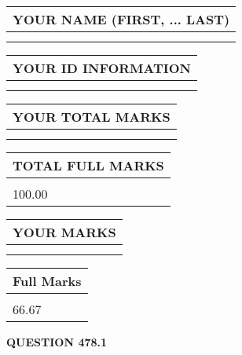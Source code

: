\documentclass{ctexart}
\begin{document}
   
   
   
\newpage 
\setcounter{page}{ 
   478001 } 
   
   
   
   
\noindent\begin{tabular}{|l|}
\hline
YOUR NAME (FIRST, ... LAST)  \\
\hline
 \\ 
 \\ 
\hline
\end{tabular}
\hspace{0.05in} \begin{tabular}{|l|}
\hline
 YOUR   ID   INFORMATION  \\
\hline
 \\ 
 \\ 
\hline
\end{tabular}
   
   
\vspace{0.2in}\noindent\begin{tabular}{|l|}
\hline
YOUR TOTAL MARKS  \\
\hline
 \\ 
 \\ 
\hline
\end{tabular}
\hspace{0.05in} \begin{tabular}{|l|}
\hline
TOTAL FULL MARKS  \\
\hline
 \\ 
100.00 \\
\hline
\end{tabular}
   
   
 \vspace{0.2in}
 
 
 
 
   
   
  
\vspace{0.2in}
  
\noindent\begin{tabular}{|l|}
\hline
 YOUR MARKS  \\
\hline
 \\ 
 \\ 
\hline
\end{tabular}
\hspace{0.05in} \begin{tabular}{|l|}
\hline
 Full Marks  \\
\hline
 \\ 
66.67 \\
\hline
\end{tabular}
{\textbf{\Large{QUESTION
478.1 
}}}
  
\end{document}
